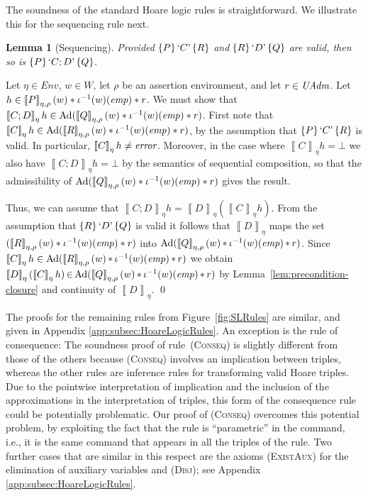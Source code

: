 \documentclass{LMCS}
\newtheorem{lemma}[theorem]{Lemma}
\theoremstyle{remark}
\newcommand{\ERR}{\ensuremath{\mbox{\it error}}\xspace}
\newcommand{\QUOTE}[1]{\textnormal{`\ensuremath{#1}'}}
\newcommand{\Env}{\ensuremath{\textit{Env}}\xspace}
\newcommand{\triple}[3]{{\ensuremath{\!\left.\{ #1 \}\, #2\, \{  #3 \}\!\right.}}}
\newcommand{\wemp}{\textnormal{\textit{emp}}}
\newcommand{\den}[1]{\left\llbracket #1
  \right\rrbracket}
\newcommand{\W}{\ensuremath{W}}
\newcommand{\UNFOLD}{\ensuremath{\iota^{-1}}}
\begin{document}
The soundness of the standard Hoare logic rules is   straightforward. We illustrate this for the sequencing rule next. 

\begin{lemma}[Sequencing] 
Provided $\triple{P}{\QUOTE {C}}{R}$ and $\triple{R}{\QUOTE{D}}{Q}$ are valid, then so is $\triple{P}{\QUOTE{C;D}}{Q}$.  
\end{lemma}

\proof
Let $\eta\in\Env$, $w\in\W$, let $\rho$ be an assertion environment, and let  $r\in\mathit{UAdm}$. 
Let  $h\in\den{P}_{\eta,\rho}(w)*\UNFOLD(w)(\wemp)*r$. 
We must show that $\den{C;D}_\eta h\in\DCl(\den{Q}_{\eta,\rho}(w)*\UNFOLD(w)(\wemp)*r)$. 
First note that $\den{C}_\eta h\in\DCl(\den{R}_{\eta,\rho}(w)*\UNFOLD(w)(\wemp)*r)$, by the assumption that $\triple{P}{\QUOTE {C}}{R}$ is valid. In particular, $\den{C}_\eta h\neq\ERR$. Moreover, in the case where $\den{C}_\eta h = \bot$ we also have 
$\den{C;D}_\eta h = \bot$ by the semantics of sequential composition, so that the admissibility of $\DCl(\den{Q}_{\eta,\rho}(w)*\UNFOLD(w)(\wemp)*r)$ gives the result. 

Thus, we can assume that $\den{C;D}_\eta h = \den{D}_\eta(\den{C}_\eta h)$. 
From the assumption that $\triple{R}{\QUOTE{D}}{Q}$ is valid it follows that $\den{D}_\eta$ maps the set $(\den{R}_{\eta,\rho}(w)*\UNFOLD(w)(\wemp)*r)$ into $\DCl(\den{Q}_{\eta,\rho}(w)\mathop*\UNFOLD(w)(\wemp)\mathop*r)$. 
Since $\den{C}_\eta h\in \DCl(\den{R}_{\eta,\rho}(w)\mathop*\UNFOLD(w)(\wemp)\mathop*r)$ we   obtain 
$\den{D}_\eta(\den{C}_\eta h)\,{\in}\, \DCl(\den{Q}_{\eta,\rho}(w)\mathop{*}\UNFOLD(w)(\wemp)\mathop{*}r)$ by Lemma~\ref{lem:precondition-closure} and   continuity of $\den{D}_\eta$. \qed




The proofs for the remaining rules from Figure~\ref{fig:SLRules} are similar, and given in  Appendix  \ref{app:subsec:HoareLogicRules}. An exception is the rule of consequence: 
The soundness
proof of rule~(\textsc{Conseq}) is slightly
different from those of the others because (\textsc{Conseq})  involves
 an implication between triples, whereas the other rules are inference rules
for transforming valid Hoare triples. 
Due to the pointwise interpretation of implication and the inclusion of the approximations 
in the interpretation of triples, this form of the consequence rule 
could be potentially problematic. Our proof of (\textsc{Conseq}) overcomes this potential problem, 
by exploiting the fact that
the rule is ``parametric'' in the command, i.e.,  it is the same command that appears in 
all the triples of the rule. {Two further cases that are similar in this respect are the axioms (\textsc{ExistAux}) for the elimination of auxiliary variables and (\textsc{Disj}); see Appendix  \ref{app:subsec:HoareLogicRules}.} 
\end{document}
